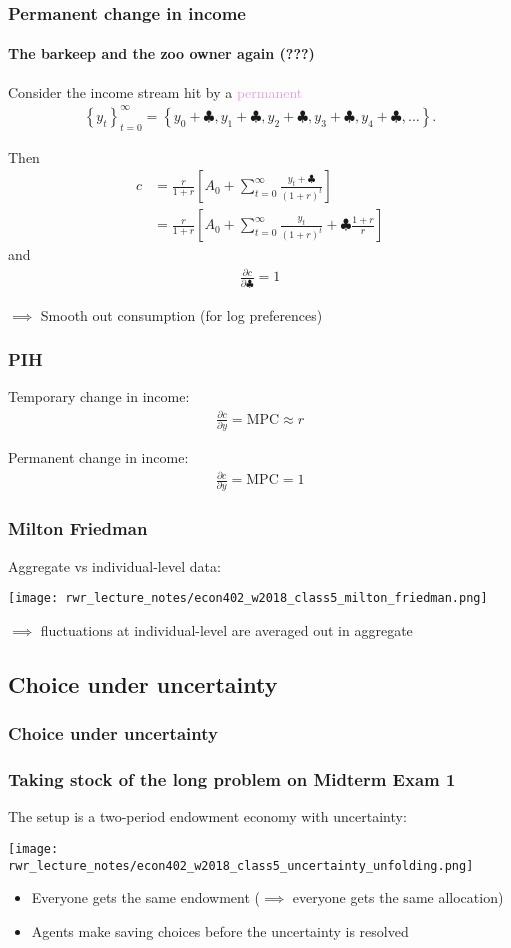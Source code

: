 \documentclass[presentation,dvipsnames]{beamer}
\begin{document}
\begin{frame}
\frametitle{Permanent change in income}
\framesubtitle{The barkeep and the zoo owner again (???)}
Consider the income stream hit by a \textcolor{Plum}{permanent}
\begin{align*}
\left\{ y_{t} \right\}_{t=0}^{\infty} = \left\{ y_{0} + \clubsuit,y_{1}+\clubsuit,y_{2}+\clubsuit,y_{3}+\clubsuit,y_{4}+
\clubsuit,\dots \right\}.
\end{align*}

Then
\begin{align*}
c &= \frac{r}{1+r} \left[ A_{0} + \sum\limits_{t=0}^{\infty} \frac{y_{t}+\clubsuit}{(1+r)^{t}} \right] \\
&= \frac{r}{1+r} \left[ A_{0} + \sum\limits_{t=0}^{\infty} \frac{y_{t}}{(1+r)^{t}}  + \clubsuit \frac{1+r}{r}\right]
\end{align*}
and
\begin{align*}
\frac{\partial c}{\partial \clubsuit} = 1
\end{align*}

$\implies$ Smooth out consumption (for log preferences)
\end{frame}

\begin{frame}
\frametitle{PIH}
Temporary change in income:
\begin{align*}
\frac{\partial c}{\partial y} = \text{MPC} \approx r
\end{align*}

Permanent change in income:
\begin{align*}
\frac{\partial c}{\partial y} = \text{MPC} = 1
\end{align*}
\end{frame}

\begin{frame}
\frametitle{Milton Friedman}
Aggregate vs individual-level data:
\centerline{\texttt{[image: rwr\_lecture\_notes/econ402\_w2018\_class5\_milton\_friedman.png]}}

$\implies$ fluctuations at individual-level are averaged out in aggregate
\end{frame}

\subsection{Choice under uncertainty}

\begin{frame}
\frametitle{Choice under uncertainty}
\frametitle{Taking stock of the long problem on Midterm Exam 1}
The setup is a two-period endowment economy with uncertainty:
\centerline{\texttt{[image: rwr\_lecture\_notes/econ402\_w2018\_class5\_uncertainty\_unfolding.png]}}
\begin{itemize}[label={--}]
\item Everyone gets the same endowment ($\implies$ everyone gets the same allocation)
\item Agents make saving choices before the uncertainty is resolved
\end{itemize}
\end{frame}
\end{document}
